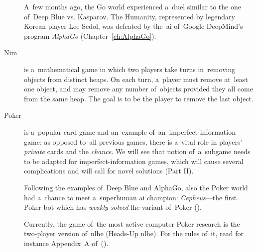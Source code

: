 \begin{description}
    A~few months ago, the Go world experienced a~duel similar to the one of~Deep Blue vs. Kasparov.
    The Humanity, represented by legendary Korean player Lee Sedol, was defeated by the~\acrshort{ai} of~Google DeepMind's program \emph{AlphaGo} (Chapter~\ref{ch:AlphaGo}).

  \item [Nim] is a~mathematical game in which two players take turns in~removing objects from distinct heaps.
    On each turn, a~player must remove at~least one object, and may remove any number of~objects provided they all come from the same heap.
    The goal is to be the player to remove the last object.

  \item [Poker] is a~popular card game
    and an~example of~an~imperfect-information game:
    as opposed to~all previous games, there is a~vital role in players' \emph{private} cards and the \emph{chance}.
    We will see that notion of~a~subgame needs to be adapted for imperfect-information games, which will cause several complications and will call for novel solutions (Part II).

    Following the examples of~Deep Blue and AlphaGo, also the Poker world had a~chance to meet a~superhuman \acrshort{ai} champion:
    \emph{Cepheus}---the first Poker-bot which has \emph{weakly solved} \acrlong{lhe} variant of~Poker (\cite{Bowling2015heads}).

    Currently, the game of~the most active computer Poker research is the two-player version of~\acrlong{nlhe} (Heads-Up \acrshort{nlhe}).
    For the rules of~it, read for instance Appendix~A of~(\cite{Ganzfried2015endgame}).
\end{description}



